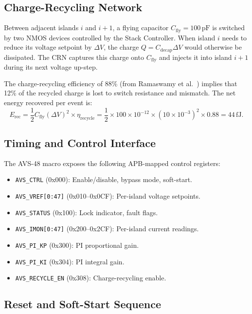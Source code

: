 \subsection{Charge-Recycling Network}

Between adjacent islands $i$ and $i+1$, a flying capacitor
$C_{\mathrm{fly}} = 100\,\mathrm{pF}$ is switched by two NMOS devices
controlled by the Stack Controller.  When island $i$ needs to reduce
its voltage setpoint by $\Delta V$, the charge $Q = C_{\mathrm{decap}}
\Delta V$ would otherwise be dissipated.  The CRN captures this charge
onto $C_{\mathrm{fly}}$ and injects it into island $i+1$ during its
next voltage up-step.

The charge-recycling efficiency of 88\% (from Ramaswamy
et al.~\cite{ramaswamy2023}) implies that 12\% of the recycled
charge is lost to switch resistance and mismatch.  The net
energy recovered per event is:
\[
  E_{\mathrm{rec}} = \frac{1}{2} C_{\mathrm{fly}} (\Delta V)^2
    \times \eta_{\mathrm{recycle}} = \frac{1}{2}
    \times 100 \times 10^{-12}
    \times (10 \times 10^{-3})^2 \times 0.88
  = 44\,\mathrm{fJ}.
\]

\subsection{Timing and Control Interface}

The AVS-48 macro exposes the following APB-mapped control registers:
\begin{itemize}
  \item \texttt{AVS\_CTRL} (0x000): Enable/disable, bypass mode, soft-start.
  \item \texttt{AVS\_VREF[0:47]} (0x010--0x0CF): Per-island voltage setpoints.
  \item \texttt{AVS\_STATUS} (0x100): Lock indicator, fault flags.
  \item \texttt{AVS\_IMON[0:47]} (0x200--0x2CF): Per-island current readings.
  \item \texttt{AVS\_PI\_KP} (0x300): PI proportional gain.
  \item \texttt{AVS\_PI\_KI} (0x304): PI integral gain.
  \item \texttt{AVS\_RECYCLE\_EN} (0x308): Charge-recycling enable.
\end{itemize}

\subsection{Reset and Soft-Start Sequence}

